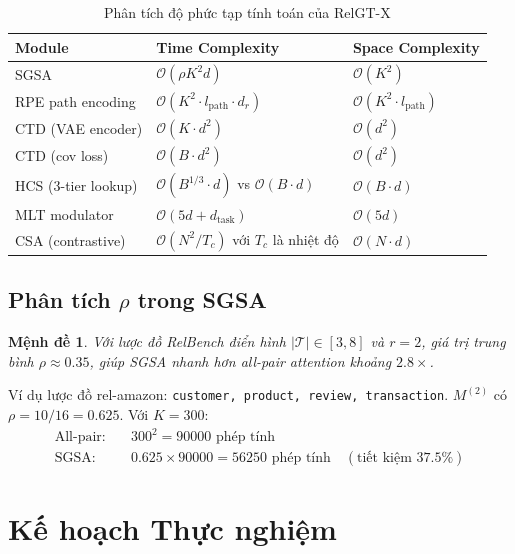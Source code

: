 \documentclass[12pt,a4paper]{article}
\newtheorem{proposition}[theorem]{Mệnh đề}
\begin{document}
\begin{table}[H]
\centering
\caption{Phân tích độ phức tạp tính toán của RelGT-X}
\begin{tabular}{lll}
\toprule
\textbf{Module} & \textbf{Time Complexity} & \textbf{Space Complexity} \\
\midrule
SGSA & $\mathcal{O}(\rho K^2 d)$ & $\mathcal{O}(K^2)$ \\
RPE path encoding & $\mathcal{O}(K^2 \cdot l_\text{path} \cdot d_r)$ & $\mathcal{O}(K^2 \cdot l_\text{path})$ \\
CTD (VAE encoder) & $\mathcal{O}(K \cdot d^2)$ & $\mathcal{O}(d^2)$ \\
CTD (cov loss) & $\mathcal{O}(B \cdot d^2)$ & $\mathcal{O}(d^2)$ \\
HCS (3-tier lookup) & $\mathcal{O}(B^{1/3} \cdot d)$ vs $\mathcal{O}(B \cdot d)$ & $\mathcal{O}(B \cdot d)$ \\
MLT modulator & $\mathcal{O}(5d + d_\text{task})$ & $\mathcal{O}(5d)$ \\
CSA (contrastive) & $\mathcal{O}(N^2 / T_c)$ với $T_c$ là nhiệt độ & $\mathcal{O}(N \cdot d)$ \\
\bottomrule
\end{tabular}
\end{table}

\subsection{Phân tích $\rho$ trong SGSA}

\begin{proposition}
Với lược đồ RelBench điển hình $|\mathcal{T}| \in [3,8]$ và $r=2$,
giá trị trung bình $\rho \approx 0.35$, giúp SGSA nhanh hơn all-pair
attention khoảng $2.8\times$.
\end{proposition}

Ví dụ lược đồ rel-amazon: \texttt{customer, product, review, transaction}.
$M^{(2)}$ có $\rho = 10/16 = 0.625$. Với $K=300$:
\begin{align*}
  \text{All-pair:} &\quad 300^2 = 90000 \text{ phép tính}\\
  \text{SGSA:} &\quad 0.625 \times 90000 = 56250 \text{ phép tính} \quad (\text{tiết kiệm }37.5\%)
\end{align*}

\section{Kế hoạch Thực nghiệm}
\end{document}
